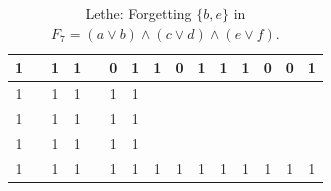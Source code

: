 \begin{table}[!tb]
\begin{tabular}{|c|c|c|c|c|c|c|c|c|c|c|c|c|c|c|}
        \rowcolor{yellow!40} 1 &  & 1 & 1 &  & 0 & 1 & 1 & 0 & 1 & 1 & 1 & 0 & 0 & 1 \\ \hline
        \rowcolor{gray!40} 1 &  & 1 & 1 &  & 1 & 1 &  &  &  &  &  &  &  &  \\ \hline
        \rowcolor{gray!40} 1 &  & 1 & 1 &  & 1 & 1 &  &  &  &  &  &  &  &  \\ \hline
        \rowcolor{gray!40} 1 &  & 1 & 1 &  & 1 & 1 &  &  &  &  &  &  &  &  \\ \hline
        \rowcolor{gray!40} 1 &  & 1 & 1 &  & 1 & 1 & 1 & 1 & 1 & 1 & 1 & 1 & 1 & 1 \\ \hline
    \end{tabular}
    \caption{Lethe: Forgetting $\{b, e\}$ in $F_{7} = (a \lor b) \land (c \lor d) \land (e \lor f)$.}
    \label{tab:lethe-F7-be}
\end{table}

